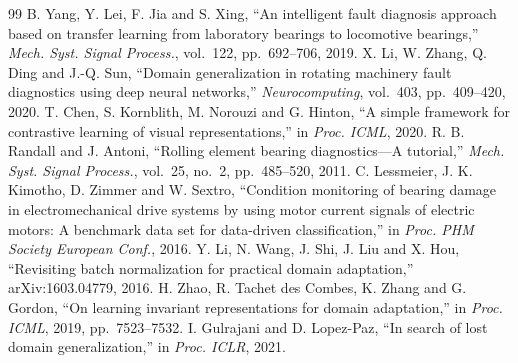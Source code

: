 \documentclass[conference]{IEEEtran}
\begin{document}
\begin{thebibliography}{99}
 B. Yang, Y. Lei, F. Jia and S. Xing, ``An intelligent fault diagnosis
approach based on transfer learning from laboratory bearings to locomotive bearings,''
\emph{Mech. Syst. Signal Process.}, vol.~122, pp.~692--706, 2019.
 X. Li, W. Zhang, Q. Ding and J.-Q. Sun, ``Domain generalization in rotating
machinery fault diagnostics using deep neural networks,'' \emph{Neurocomputing}, vol.~403,
pp.~409--420, 2020.
 T. Chen, S. Kornblith, M. Norouzi and G. Hinton, ``A simple framework
for contrastive learning of visual representations,'' in \emph{Proc. ICML}, 2020.
 R. B. Randall and J. Antoni, ``Rolling element bearing diagnostics---A
tutorial,'' \emph{Mech. Syst. Signal Process.}, vol.~25, no.~2, pp.~485--520, 2011.
 C. Lessmeier, J. K. Kimotho, D. Zimmer and W. Sextro, ``Condition
monitoring of bearing damage in electromechanical drive systems by using motor current signals
of electric motors: A benchmark data set for data-driven classification,'' in \emph{Proc. PHM
Society European Conf.}, 2016.
 Y. Li, N. Wang, J. Shi, J. Liu and X. Hou, ``Revisiting batch
normalization for practical domain adaptation,'' arXiv:1603.04779, 2016.
 H. Zhao, R. Tachet des Combes, K. Zhang and G. Gordon, ``On learning
invariant representations for domain adaptation,'' in \emph{Proc. ICML}, 2019, pp.~7523--7532.
 I. Gulrajani and D. Lopez-Paz, ``In search of lost domain
generalization,'' in \emph{Proc. ICLR}, 2021.
\end{thebibliography}
\end{document}
